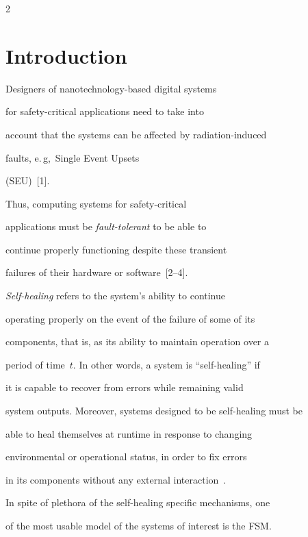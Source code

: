       \begin{multicols}{2}



      \label{st\stat}







\section{Introduction}



\noindent

Designers of nanotechnology-based digital systems

for safety-critical applications need to take into

account that the systems can be affected by radiation-induced

faults, e.\,g,\ Single Event Upsets

(SEU)~[1].

Thus, computing systems for safety-critical

applications must be \textit{fault-tolerant} to be able to

continue properly functioning despite these transient

failures of their hardware or software~[2--4].



{\it Self-healing} refers to the system's ability to continue

operating properly on the event of the failure of some of its

components, that is, as its ability to maintain operation over a

period of time~$t$. In other words, a system is ``self-healing'' if

it is capable to recover from errors while remaining valid

system outputs. Moreover, systems designed to be self-healing must be

able to heal themselves at runtime in response to changing

environmental or operational status, in order to fix errors

in its components without any external interaction~\cite{4fr}.



In spite of plethora of the self-healing specific mechanisms, one

of the most usable model of the systems of interest is the FSM.


\end{multicols}
